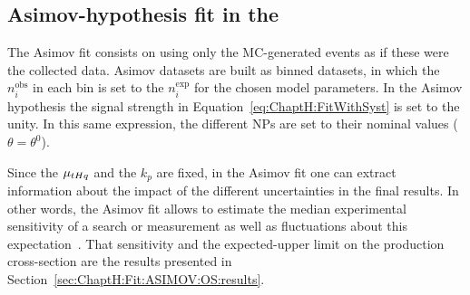 \FloatBarrier
\subsection{Asimov-hypothesis fit in the \dilepOStau}
\label{sec:ChaptH:Fit:ASIMOV:OS}
The Asimov fit consists on using only the MC-generated events as if these were the collected data. 
Asimov datasets are built as binned datasets, in which the $n_{i}^{\text{obs}}$
in each bin is set to the $n_{i}^{\text{exp}}$ for the chosen model parameters.
In the Asimov hypothesis the signal strength in Equation~\ref{eq:ChaptH:FitWithSyst} is set to the unity. 
In this same expression, the different NPs are set to their nominal values ($\theta = \theta^{0}$).

Since the $\mu_{tHq}$ and the $k_p$ are fixed, in the Asimov fit one can extract 
information about the impact of the different uncertainties in the final results. In other
words, the Asimov fit allows to estimate the median experimental sensitivity of  
a search or measurement as well as fluctuations about this expectation~\cite{Cowan:2010js}. 
That sensitivity and the expected-upper limit on the production cross-section are
the results presented in Section~\ref{sec:ChaptH:Fit:ASIMOV:OS:results}.










